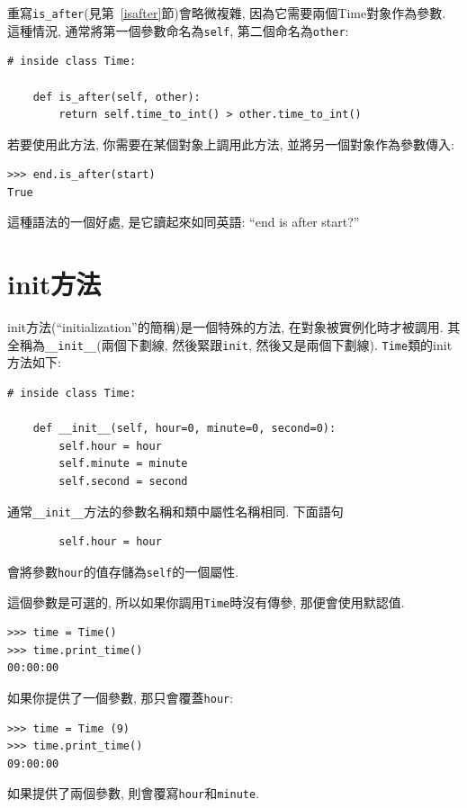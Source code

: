 \documentclass[10pt]{book}
\begin{document}
重寫\verb"is_after"(見第~\ref{isafter}節)會略微複雜, 因為它需要兩個Time對象作為參數. 
這種情況, 通常將第一個參數命名為{\tt self}, 第二個命名為{\tt other}:

\begin{verbatim}
# inside class Time:

    def is_after(self, other):
        return self.time_to_int() > other.time_to_int()
\end{verbatim}
%
若要使用此方法, 你需要在某個對象上調用此方法, 並將另一個對象作為參數傳入:

\begin{verbatim}
>>> end.is_after(start)
True
\end{verbatim}
%
這種語法的一個好處, 是它讀起來如同英語: ``end is after start?''


\section{init方法}

init方法(``initialization''的簡稱)是一個特殊的方法, 
在對象被實例化時才被調用. 
其全稱為\verb"__init__"(兩個下劃線, 然後緊跟{\tt init}, 然後又是兩個下劃線).
{\tt Time}類的init方法如下:

\begin{verbatim}
# inside class Time:

    def __init__(self, hour=0, minute=0, second=0):
        self.hour = hour
        self.minute = minute
        self.second = second
\end{verbatim}
%
通常\verb"__init__"方法的參數名稱和類中屬性名稱相同. 
下面語句

\begin{verbatim}
        self.hour = hour
\end{verbatim}
%
會將參數{\tt hour}的值存儲為{\tt self}的一個屬性.

這個參數是可選的, 所以如果你調用{\tt Time}時沒有傳參, 
那便會使用默認值. 

\begin{verbatim}
>>> time = Time()
>>> time.print_time()
00:00:00
\end{verbatim}
%
如果你提供了一個參數, 那只會覆蓋{\tt hour}:

\begin{verbatim}
>>> time = Time (9)
>>> time.print_time()
09:00:00
\end{verbatim}
%
如果提供了兩個參數, 則會覆寫{\tt hour}和{\tt minute}.
\end{document}
